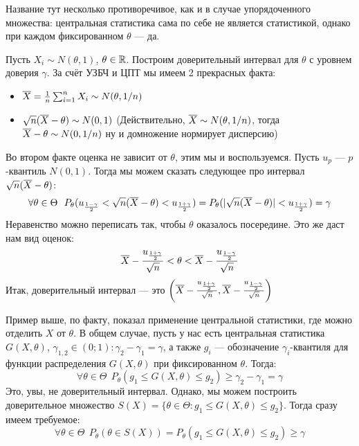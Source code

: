 \begin{anote}
	Название тут несколько противоречивое, как и в случае упорядоченного множества: центральная статистика сама по себе не является статистикой, однако при каждом фиксированном $\theta$ --- да.
\end{anote}

\begin{example}
	Пусть $X_i \sim N(\theta, 1)$, $\theta \in \mathbb{R}$. Построим доверительный интервал для $\theta$ с уровнем доверия $\gamma$. За счёт УЗБЧ и ЦПТ мы имеем 2 прекрасных факта:
	\begin{itemize}
		\item $\overline{X} = \frac{1}{n}\sum_{i = 1}^n X_i \sim N(\theta, 1 / n)$
		
		\item $\sqrt{n}(\overline{X} - \theta) \sim N(0, 1)$ (Действительно, $\overline{X} \sim N(\theta, 1 / n)$, тогда $\overline{X} - \theta \sim N(0, 1 / n)$ ну и домножение нормирует дисперсию)
	\end{itemize}
	Во втором факте оценка не зависит от $\theta$, этим мы и воспользуемся. Пусть $u_p$ --- $p$-квантиль $N(0, 1)$. Тогда мы можем сказать следующее про интервал $\sqrt{n}(\overline{X} - \theta)$:
	\[
		\forall \theta \in \Theta\ \ P_\theta(u_{\frac{1 - \gamma}{2}} < \sqrt{n}(\overline{X} - \theta) < u_{\frac{1 + \gamma}{2}}) = P_\theta(|\sqrt{n}(\overline{X} - \theta)| < u_{\frac{1 + \gamma}{2}}) = \gamma
	\]
	Неравенство можно переписать так, чтобы $\theta$ оказалось посередине. Это же даст нам вид оценок:
	\[
		 \overline{X} - \frac{u_{\frac{1 + \gamma}{2}}}{\sqrt{n}} < \theta < \overline{X} - \frac{u_{\frac{1 - \gamma}{2}}}{\sqrt{n}}
	\]
	Итак, доверительный интервал --- это $\left(\overline{X} - \frac{u_{\frac{1 + \gamma}{2}}}{\sqrt{n}}, \overline{X} - \frac{u_{\frac{1 - \gamma}{2}}}{\sqrt{n}}\right)$
\end{example}

\begin{note}
	Пример выше, по факту, показал применение центральной статистики, где можно отделить $X$ от $\theta$. В общем случае, пусть у нас есть центральная статистика $G(X, \theta)$, $\gamma_{1, 2} \in (0; 1) \colon \gamma_2 - \gamma_1 = \gamma$, а также $g_i$ --- обозначение $\gamma_i$-квантиля для функции распределения $G(X, \theta)$ при фиксированном $\theta$. Тогда:
	\[
		\forall \theta \in \Theta\ \ P_\theta(g_1 \le G(X, \theta) \le g_2) \ge \gamma_2 - \gamma_1 = \gamma
	\]
	Это, увы, не доверительный интервал. Однако, мы можем построить доверительное множество $S(X) = \{\theta \in \Theta \colon g_1 \le G(X, \theta) \le g_2\}$. Тогда сразу имеем требуемое:
	\[
		\forall \theta \in \Theta\ \ P_\theta(\theta \in S(X)) = P_\theta(g_1 \le G(X, \theta) \le g_2) \ge \gamma
	\]
\end{note}

